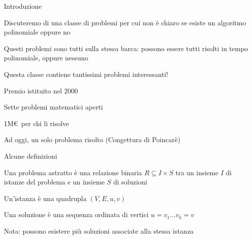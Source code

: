 \begin{frame}{Introduzione}

\vspace{-9pt}
\begin{myboxtitle}
\BIL
\item Discuteremo di una classe di problemi per cui non è chiaro se esiste
un algoritmo polinomiale oppure no
\item Questi problemi sono tutti sulla stessa barca: 
  possono essere tutti risolti in tempo polinomiale, oppure nessuno
\item Questa classe contiene tantissimi problemi interessanti!
\EIL
\end{myboxtitle}

\begin{myboxtitle}
\BI
\item Premio istituito nel 2000
\item Sette problemi matematici aperti
\item 1M\euro\ per chi li risolve
\item Ad oggi, un solo problema risolto (Congettura di Poincarè)
\EI
\end{myboxtitle}

\end{frame}


\begin{frame}{Alcune definizioni}

\vspace{-9pt}
\begin{myboxtitle}
Una \alert{problema astratto} è una relazione binaria $R \subseteq I \times S$
tra un insieme $I$ di istanze del problema e un insieme $S$ di
soluzioni
\end{myboxtitle}

\begin{myboxtitle}
\BIL
\item Un'istanza è una quadrupla $(V,E,u,v)$
\item Una soluzione è una sequenza ordinata di vertici $u = v_1 \ldots v_k = v$
\item Nota: possono esistere più soluzioni associate alla stessa istanza
\EIL
\end{myboxtitle}

\end{frame}


